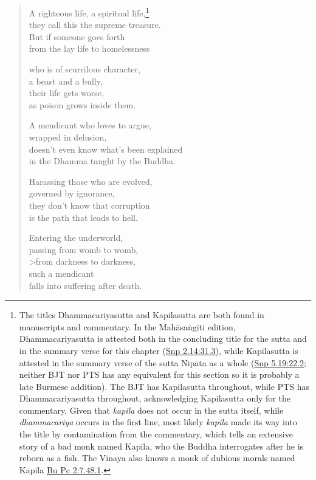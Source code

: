 \documentclass[12pt,openany]{book}%
\begin{document}
\begin{verse}%
A righteous life, a spiritual life,\footnote{The titles Dhammacariyasutta and Kapilasutta are both found in manuscripts and commentary. In the \textsanskrit{Mahāsaṅgīti} edition, Dhammacariyasutta is attested both in the concluding title for the sutta and in the summary verse for this chapter (\href{https://suttacentral.net/snp2.14/en/sujato\#31.3}{Snp 2.14:31.3}), while Kapilasutta is attested in the summary verse of the sutta \textsanskrit{Nipāta} as a whole (\href{https://suttacentral.net/snp5.19/en/sujato\#22.2}{Snp 5.19:22.2}; neither BJT nor PTS has any equivalent for this section so it is probably a late Burmese addition). The BJT has Kapilasutta throughout, while PTS has Dhammacariyasutta throughout, acknowledging Kapilasutta only for the commentary. Given that \textit{kapila} does not occur in the sutta itself, while \textit{dhammacariya} occurs in the first line, most likely \textit{kapila} made its way into the title by contamination from the commentary, which tells an extensive story of a bad monk named Kapila, who the Buddha interrogates after he is reborn as a fish. The Vinaya also knows a monk of dubious morals named Kapila \href{https://suttacentral.net/pli-tv-bu-vb-pc2/en/sujato\#7.48.1}{Bu Pc 2:7.48.1}. } \\
they call this the supreme treasure. \\
But if someone goes forth \\
from the lay life to homelessness 

who is of scurrilous character, \\
a beast and a bully, \\
their life gets worse, \\
as poison grows inside them. 

A mendicant who loves to argue, \\
wrapped in delusion, \\
doesn’t even know what’s been explained \\
in the Dhamma taught by the Buddha. 

Harassing those who are evolved, \\
governed by ignorance, \\
they don’t know that corruption \\
is the path that leads to hell. 

Entering the underworld, \\
passing from womb to womb, \\>from darkness to darkness, \\
such a mendicant \\
falls into suffering after death. 


\end{verse}
\end{document}
